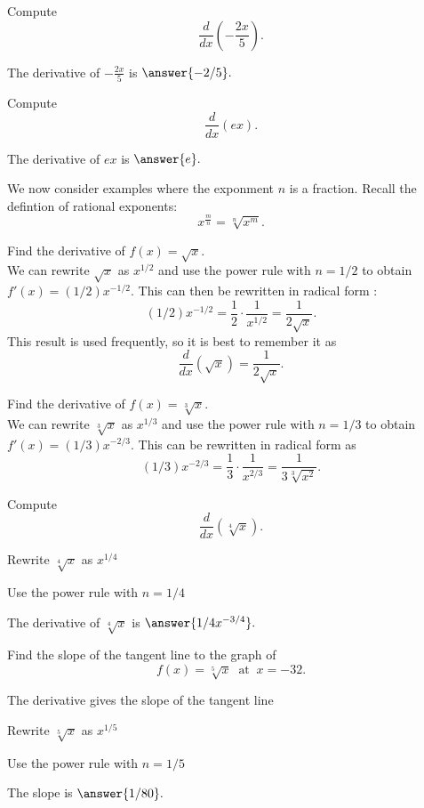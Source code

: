 \documentclass{ximera}
\begin{document}
\begin{problem}
Compute
\[
\frac{d}{dx} \left(-\frac{2x}{5}\right).
\]

The derivative of $-\frac{2x}{5}$ is $\answer{-2/5}.$
\end{problem}

\begin{problem}
Compute
\[
\frac{d}{dx} \left(ex\right).
\]

The derivative of $ex$ is $\answer{e}.$
\end{problem}

We now consider examples where the exponment $n$ is a fraction. Recall the defintion of rational exponents:
\[
x^{\frac{m}{n}} = \sqrt[n]{x^m}.
\]

\begin{example} %
Find the derivative of $f(x) = \sqrt x$.\\
We can rewrite $\sqrt x$ as $x^{1/2}$ and use the power rule 
with $n = 1/2$ to obtain $f'(x) = (1/2)x^{-1/2}$.  This can then be rewritten in radical form :
\[(1/2)x^{-1/2} = \frac{1}{2}\cdot \frac{1}{x^{1/2}} = \frac{1}{2\sqrt x}.\]
This result is used frequently, so it is best to remember it as
\[\frac{d}{dx}\left(\sqrt x\right) = \frac{1}{2\sqrt x}.\]
\end{example}




\begin{example} %
Find the derivative of $f(x) = \sqrt[3] x$.\\
We can rewrite $\sqrt[3] x$ as $x^{1/3}$ and use the power rule with $n = 1/3$ to obtain
$f'(x) = (1/3)x^{-2/3}$.  This can be rewritten in radical form as 
\[(1/3)x^{-2/3} = \frac{1}{3}\cdot \frac{1}{x^{2/3}} = \frac{1}{3\sqrt[3] {x^2}}.\]
\end{example}

\begin{problem}
Compute
\[
\frac{d}{dx} \left(\sqrt[4] x\right).
\]
\begin{hint}
Rewrite $\sqrt[4] x$ as $x^{1/4}$
\end{hint}
\begin{hint}
Use the power rule with $n = 1/4$
\end{hint}
The derivative of $\sqrt[4] x$ is $\answer{1/4 x^{-3/4}}.$
\end{problem}

\begin{problem}
Find the slope of the tangent line to the graph of 
\[
f(x) = \sqrt[5] x  \;\; \text{at} \;\; x = -32.
\]


\begin{hint}
The derivative gives the slope of the tangent line
\end{hint}
\begin{hint}
Rewrite $\sqrt[5] x$ as $x^{1/5}$
\end{hint}
\begin{hint}
Use the power rule with $n = 1/5$
\end{hint}
The slope is  $\answer{1/80}.$
\end{problem}
\end{document}
